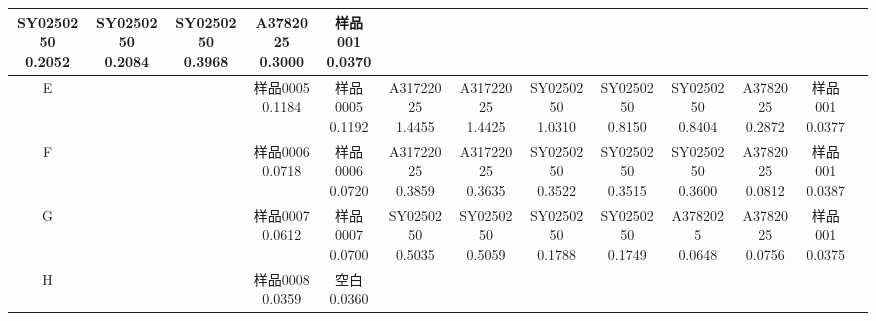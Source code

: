 \documentclass[UTF8,10pt,a4paper,fontset=fandol]{ctexart}
\begin{document}
\begin{center}
\begin{tabular}{|c|c|c|c|c|c|c|c|c|c|c|c|c|}
\shortstack{SY0250250\\0.2052} & \shortstack{SY0250250\\0.2084} &
\shortstack{SY0250250\\0.3968} & \shortstack{A3782025\\0.3000} &
\shortstack{样品001\\0.0370} & \\
\hline
E & & & \shortstack{样品0005\\0.1184} & \shortstack{样品0005\\0.1192} &
\shortstack{A31722025\\1.4455} & \shortstack{A31722025\\1.4425} &
\shortstack{SY0250250\\1.0310} & \shortstack{SY0250250\\0.8150} &
\shortstack{SY0250250\\0.8404} & \shortstack{A3782025\\0.2872} &
\shortstack{样品001\\0.0377} & \\
\hline
F & & & \shortstack{样品0006\\0.0718} & \shortstack{样品0006\\0.0720} &
\shortstack{A31722025\\0.3859} & \shortstack{A31722025\\0.3635} &
\shortstack{SY0250250\\0.3522} & \shortstack{SY0250250\\0.3515} &
\shortstack{SY0250250\\0.3600} & \shortstack{A3782025\\0.0812} &
\shortstack{样品001\\0.0387} & \\
\hline
G & & & \shortstack{样品0007\\0.0612} & \shortstack{样品0007\\0.0700} &
\shortstack{SY0250250\\0.5035} & \shortstack{SY0250250\\0.5059} &
\shortstack{SY0250250\\0.1788} & \shortstack{SY0250250\\0.1749} &
\shortstack{A3782025\\0.0648} & \shortstack{A3782025\\0.0756} &
\shortstack{样品001\\0.0375} & \\
\hline
H & & & \shortstack{样品0008\\0.0359} & \shortstack{空白\\0.0360} &

\end{tabular}
\end{center}
\end{document}
